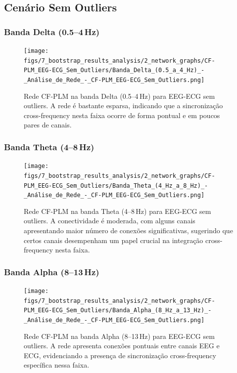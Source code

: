 \subsection{Cenário Sem Outliers}
\subsubsection{\texorpdfstring{Banda Delta (0.5--4\,Hz)}{Banda Delta (0.5-4 Hz)}}
\begin{figure}[htb]
  \centering
  \texttt{[image: figs/7\_bootstrap\_results\_analysis/2\_network\_graphs/CF-PLM\_EEG-ECG\_Sem\_Outliers/Banda\_Delta\_(0.5\_a\_4\_Hz)\_-\_Análise\_de\_Rede\_-\_CF-PLM\_EEG-ECG\_Sem\_Outliers.png]}
  \caption{Rede CF-PLM na banda Delta (0.5--4\,Hz) para EEG-ECG sem outliers. A rede é bastante esparsa, indicando que a sincronização cross-frequency nesta faixa ocorre de forma pontual e em poucos pares de canais.}
  \label{fig:rede_cfplm_delta_sem}
\end{figure}

\subsubsection{\texorpdfstring{Banda Theta (4--8\,Hz)}{Banda Theta (4-8 Hz)}}
\begin{figure}[htb]
  \centering
  \texttt{[image: figs/7\_bootstrap\_results\_analysis/2\_network\_graphs/CF-PLM\_EEG-ECG\_Sem\_Outliers/Banda\_Theta\_(4\_Hz\_a\_8\_Hz)\_-\_Análise\_de\_Rede\_-\_CF-PLM\_EEG-ECG\_Sem\_Outliers.png]}
  \caption{Rede CF-PLM na banda Theta (4--8\,Hz) para EEG-ECG sem outliers. A conectividade é moderada, com alguns canais apresentando maior número de conexões significativas, sugerindo que certos canais desempenham um papel crucial na integração cross-frequency nesta faixa.}
  \label{fig:rede_cfplm_theta_sem}
\end{figure}

\subsubsection{\texorpdfstring{Banda Alpha (8--13\,Hz)}{Banda Alpha (8-13 Hz)}}
\begin{figure}[htb]
  \centering
  \texttt{[image: figs/7\_bootstrap\_results\_analysis/2\_network\_graphs/CF-PLM\_EEG-ECG\_Sem\_Outliers/Banda\_Alpha\_(8\_Hz\_a\_13\_Hz)\_-\_Análise\_de\_Rede\_-\_CF-PLM\_EEG-ECG\_Sem\_Outliers.png]}
  \caption{Rede CF-PLM na banda Alpha (8--13\,Hz) para EEG-ECG sem outliers. A rede apresenta conexões pontuais entre canais EEG e ECG, evidenciando a presença de sincronização cross-frequency específica nessa faixa.}
  \label{fig:rede_cfplm_alpha_sem}
\end{figure}

